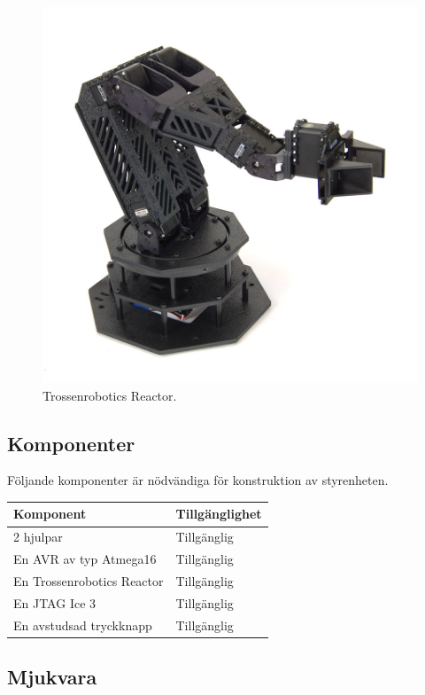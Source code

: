 \begin{figure}[h]
\center
\includegraphics[scale=0.35]{arm}
\caption{Trossenrobotics Reactor.}
\end{figure}

\subsection{Komponenter}
Följande komponenter är nödvändiga för konstruktion av styrenheten. \\
\begin{tabularx}{\textwidth}{| l | X |}
	\hline
	{\textbf{Komponent}} & {\textbf{Tillgänglighet}} \\\hline
	{2 hjulpar} & {Tillgänglig} \\\hline
	{En AVR av typ Atmega16} & {Tillgänglig} \\\hline
	{En Trossenrobotics Reactor} & {Tillgänglig} \\\hline
	{En JTAG Ice 3} & {Tillgänglig} \\\hline
	{En avstudsad tryckknapp} & {Tillgänglig} \\\hline
\end{tabularx}

\subsection{Mjukvara}

